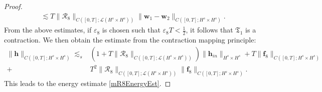 \documentclass[10pt,a4paper]{amsart}
\newcommand{\f}{\frac}
\newcommand{\mL}{\mathcal{L}}
\newcommand{\mR}{\mathcal{R}}
\begin{document}
\begin{proof}
\begin{align*}
&\lesssim T\|\mR_8\|_{C([0,T]; \mL (H^s\times H^s))}\| \mathbf{w}_1-\mathbf{w}_2\|_{C([0,T]; H^s\times H^s)}.
\end{align*}
From the above estimates,  if $\varepsilon_8$ is chosen such that $\varepsilon_8 T<\f12$, it follows that $\mathfrak{T}_1$ is a contraction. 
We then obtain the estimate from the contraction mapping principle:
\begin{align*}
 \| \mathbf{h}\|_{C([0,T]; H^s\times H^s)} \lesssim_s& (1+ T\|\mR_8\|_{C([0,T]; \mL (H^s\times H^s))})\|\mathbf{h}_{in} \|_{H^s\times H^s} + T\| \mathbf{f}_8\|_{C([0,T]; H^s\times H^s)} \\
+& T^2 \|\mR_8\|_{C([0,T]; \mL (H^s\times H^s))} \| \mathbf{f}_8\|_{C([0,T]; H^s\times H^s)}.
\end{align*}
This leads to the energy estimate \eqref{mR8EnergyEst}.
\end{proof}
\end{document}
